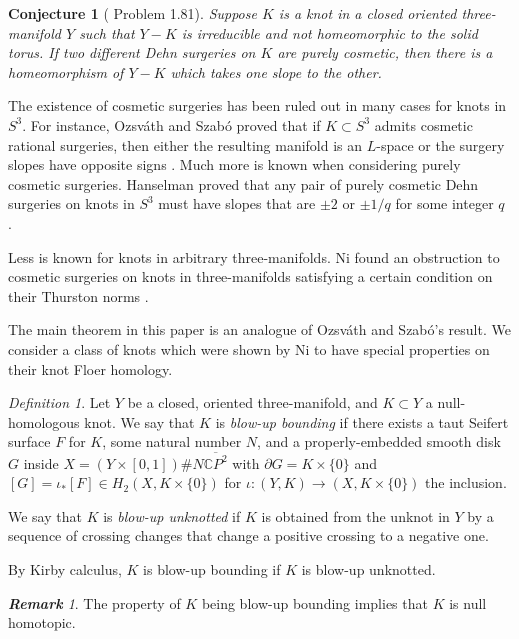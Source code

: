 \documentclass{article}
\newtheorem{conjecture}[equation]{Conjecture}
\theoremstyle{remark}
\newtheorem{definition}[equation]{Definition}
\newtheorem*{remark}{\bf Remark}
\numberwithin{equation}{section}
\numberwithin{table}{section}
\renewcommand{\(}{\left(}
\renewcommand{\)}{\right)}
\newcommand{\C}{{\mathbb{C}}}
\begin{document}
\begin{conjecture}[\cite{kirby-problem-list-1995} Problem 1.81]
Suppose $K$ is a knot in a closed oriented three-manifold $Y$ such that $Y-K$ is irreducible and not homeomorphic to the solid torus. If two different Dehn surgeries on $K$ are purely cosmetic, then there is a homeomorphism of $Y-K$ which takes one slope to the other.    
\end{conjecture}

The existence of cosmetic surgeries has been ruled out in many cases for knots in $S^3$. For instance, Ozsv\'ath and Szab\'o proved that if $K\subset S^3$ admits cosmetic rational surgeries, then either the resulting manifold is an $L$-space or the surgery slopes have opposite signs \cite{oz-sz-rational}. Much more is known when considering purely cosmetic surgeries. Hanselman proved that any pair of purely cosmetic Dehn surgeries on knots in $S^3$ must have slopes that are $\pm 2$ or $\pm 1/q$ for some integer $q$ \cite{hanselman-hf-cosmetic}.

Less is known for knots in arbitrary three-manifolds. Ni found an obstruction to cosmetic surgeries on knots in three-manifolds satisfying a certain condition on their Thurston norms \cite{ni-thurston-norm-cosmetic}. 

The main theorem in this paper is an analogue of Ozsv\'ath and Szab\'o's result. We consider a class of knots which were shown by Ni to have special properties on their knot Floer homology.

\begin{definition}
Let $Y$ be a closed, oriented three-manifold, and $K\subset Y$ a null-homologous knot. We say that $K$ is \textit{blow-up bounding} if there exists a taut Seifert surface $F$ for $K$, some natural number $N$, and a properly-embedded smooth disk $G$ inside $X=(Y\times[0,1])\# N\overline{\C P^2}$ with $\partial G=K\times\{0\}$ and $[G]=\iota_*[F]\in H_2(X,K\times\{0\})$ for $\iota:(Y,K)\to(X,K\times\{0\})$ the inclusion.

We say that $K$ is \textit{blow-up unknotted} if $K$ is obtained from the unknot in $Y$ by a sequence of crossing changes that change a positive crossing to a negative one. 
\end{definition}

By Kirby calculus, $K$ is blow-up bounding if $K$ is blow-up unknotted.

\begin{remark}
The property of $K$ being blow-up bounding implies that $K$ is null homotopic.    
\end{remark}
\end{document}
